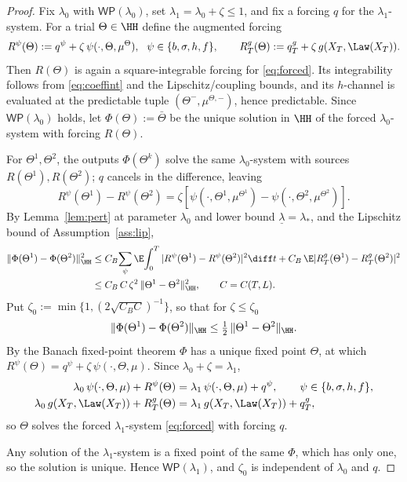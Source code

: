 \begin{proof}
Fix $\lambda_0$ with $\mathsf{WP}(\lambda_0)$, set $\lambda_1=\lambda_0+\zeta\le1$, and
fix a forcing $q$ for the $\lambda_1$-system. For a trial $\Theta\in\HH$ define the
augmented forcing
\[
R^\psi(\Theta):=q^\psi+\zeta\,\psi(\cdot,\Theta,\mu^\Theta),\ \ \psi\in\{b,\sigma,h,f\},
\qquad R^g_T(\Theta):=q^g_T+\zeta\,g(X_T,\Law(X_T)).
\]
Then $R(\Theta)$ is
again a square-integrable forcing for \eqref{eq:forced}. Its integrability follows from
\eqref{eq:coeffint} and the Lipschitz/coupling bounds, and its $h$-channel is evaluated at
the predictable tuple $(\Theta^-,\mu^{\Theta,-})$, hence predictable.
Since $\mathsf{WP}(\lambda_0)$ holds, let $\Phi(\Theta):=\bar\Theta$ be the unique
solution in $\HH$ of the forced $\lambda_0$-system with forcing $R(\Theta)$.

For $\Theta^1,\Theta^2$, the outputs $\Phi(\Theta^k)$ solve the same $\lambda_0$-system
with sources $R(\Theta^1),R(\Theta^2)$; $q$ cancels in the difference, leaving
\[
R^\psi(\Theta^1)-R^\psi(\Theta^2)=\zeta[\psi(\cdot,\Theta^1,\mu^{\Theta^1})-\psi(\cdot,\Theta^2,\mu^{\Theta^2})].
\]
By Lemma~\ref{lem:pert} at parameter $\lambda_0$ and lower bound
$\underline\lambda=\lambda_*$, and the
Lipschitz bound of Assumption~\ref{ass:lip},
\[
\begin{aligned}
\|\Phi(\Theta^1)-\Phi(\Theta^2)\|_{\HH}^2
&\le C_B\!\sum_\psi\E\!\int_0^T|R^\psi(\Theta^1)-R^\psi(\Theta^2)|^2\diff t
+C_B\,\E|R^g_T(\Theta^1)-R^g_T(\Theta^2)|^2\\
&\le C_B\,C\,\zeta^2\,\|\Theta^1-\Theta^2\|_{\HH}^2 ,\qquad C=C(T,L) .
\end{aligned}
\]
Put $\zeta_0:=\min\{1,(2\sqrt{C_BC})^{-1}\}$, so that for $\zeta\le\zeta_0$
\[
\|\Phi(\Theta^1)-\Phi(\Theta^2)\|_{\HH}\le\tfrac12\,\|\Theta^1-\Theta^2\|_{\HH} .
\]
By the Banach fixed-point theorem $\Phi$ has a unique fixed point $\Theta$, at which
$R^\psi(\Theta)=q^\psi+\zeta\,\psi(\cdot,\Theta,\mu)$. Since $\lambda_0+\zeta=\lambda_1$,
\[
\begin{aligned}
\lambda_0\,\psi(\cdot,\Theta,\mu)+R^\psi(\Theta)&=\lambda_1\,\psi(\cdot,\Theta,\mu)+q^\psi ,
\qquad\psi\in\{b,\sigma,h,f\},\\
\lambda_0\,g(X_T,\Law(X_T))+R^g_T(\Theta)&=\lambda_1\,g(X_T,\Law(X_T))+q^g_T ,
\end{aligned}
\]
so $\Theta$ solves the forced $\lambda_1$-system \eqref{eq:forced} with forcing $q$.

Any solution of the $\lambda_1$-system is a fixed point of the same $\Phi$, which has only
one, so the solution is unique. Hence $\mathsf{WP}(\lambda_1)$, and $\zeta_0$ is
independent of $\lambda_0$ and $q$.
\end{proof}

